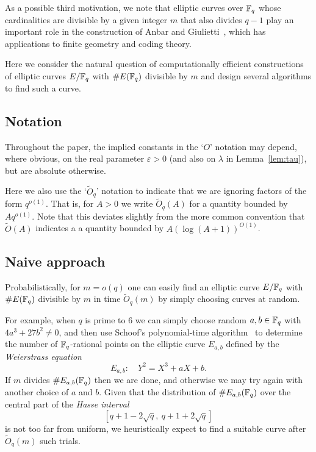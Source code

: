 \documentclass[12pt]{amsart}
\begin{document}
As a possible third motivation, we note that elliptic curves over $\mathbb{F}_q$ whose cardinalities are divisible by
a given integer $m$ that also divides $q-1$ play an important 
role in  the construction of Anbar and  Giulietti~\cite[Theorem~1]{AnGi}, which has applications to finite geometry and coding theory.

Here we consider the natural question of computationally efficient constructions of elliptic curves $E/\mathbb{F}_q$ with $\#E(\mathbb{F}_q)$ divisible by $m$ and design several algorithms to find such a curve.



\subsection{Notation}

Throughout the paper, the  implied constants in 
the `$O$' notation may depend, where obvious, on the real parameter $\varepsilon>0$ 
(and also on $\lambda$ in Lemma~\ref{lem:tau}), but 
are absolute otherwise.

Here we also use the `$\widetilde{O}_q$' notation to indicate that we are ignoring factors of the form $q^{o(1)}$.
That is,  for $A > 0$ we write  $\widetilde{O}_q(A)$ for a quantity bounded by $Aq^{o(1)}$.
Note that this deviates slightly from 
the more common convention that  $\widetilde{O}(A)$ indicates a 
a quantity bounded by $A (\log (A+1))^{O(1)}$.



 
\subsection{Naive approach}
 
 Probabilistically, for $m=o(q)$ one can easily find an elliptic curve $E/\mathbb{F}_q$ with $\#E(\mathbb{F}_q)$ divisible by $m$ in time $\widetilde{O}_q(m)$ by simply choosing curves at random.

For example, when $q$ is prime to $6$
we can simply choose random $a, b \in \mathbb{F}_q$ with $4a^3+27b^2\ne 0$, and then use Schoof's polynomial-time algorithm~\cite{Schoof} to determine the number of $\mathbb{F}_q$-rational points 
on the elliptic curve $E_{a,b}$ defined by the {\it Weierstrass equation\/}
\begin{equation}
\label{eq:Eab}
E_{a,b}:\quad Y^2  = X^3 + aX + b.
\end{equation}
If $m$ divides $\#E_{a,b}(\mathbb{F}_q)$ then we are done, and otherwise we may try again with another choice of $a$ and $b$.
Given that the distribution of $\#E_{a,b}(\mathbb{F}_q)$ over the central part of the \emph{Hasse interval}
$$
[q+1-2\sqrt{q},\ q+1+2\sqrt{q}]
$$
is not too far from uniform, we heuristically expect to find a suitable curve after $\widetilde{O}_q(m)$ such trials.
\end{document}
